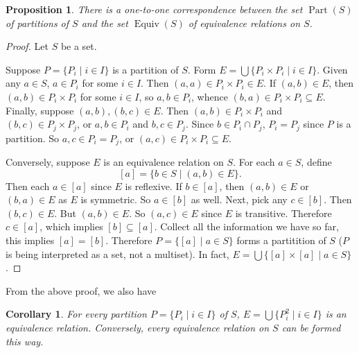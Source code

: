\documentclass[12pt]{article}
\newtheorem{prop}{Proposition}
\newtheorem{cor}{Corollary}
\begin{document}
\begin{prop}  There is a one-to-one correspondence between the set $\operatorname{Part}(S)$ of partitions of $S$ and the set $\operatorname{Equiv}(S)$ of equivalence relations on $S$.
\end{prop}

\begin{proof}
Let $S$ be a set.

Suppose $P=\lbrace P_i\mid i\in I\rbrace$ is a partition of $S$.  Form $E=\bigcup \lbrace P_i\times P_i\mid i\in I\rbrace$.  Given any $a\in S$, $a\in P_i$ for some $i\in I$.  Then $(a,a)\in P_i\times P_i\in E$.  If $(a,b)\in E$, then $(a,b)\in P_i\times P_i$ for some $i\in I$, so $a,b\in P_i$, whence $(b,a)\in P_i\times P_i\subseteq E$.  Finally, suppose $(a,b),(b,c)\in E$.  Then $(a,b)\in P_i\times P_i$ and $(b,c)\in P_j\times P_j$, or $a,b\in P_i$ and $b,c\in P_j$.  Since $b\in P_i\cap P_j$, $P_i=P_j$ since $P$ is a partition.  So $a,c\in P_i=P_j$, or $(a,c)\in P_i\times P_i\subseteq E$.

Conversely, suppose $E$ is an equivalence relation on $S$.  For each $a\in S$, define $$[a]=\lbrace b\in S\mid (a,b)\in E\rbrace.$$  Then each $a\in [a]$ since $E$ is reflexive.  If $b\in [a]$, then $(a,b)\in E$ or $(b,a)\in E$ as $E$ is symmetric.  So $a\in [b]$ as well.  Next, pick any $c\in [b]$.  Then $(b,c)\in E$.  But $(a,b)\in E$.  So $(a,c)\in E$ since $E$ is transitive.  Therefore $c\in [a]$, which implies $[b]\subseteq [a]$.  Collect all the information we have so far, this implies $[a]=[b]$.  Therefore $P=\lbrace [a]\mid a\in S\rbrace$ forms a partitition of $S$ ($P$ is being interpreted as a set, not a multiset).  In fact, $E=\bigcup \lbrace [a]\times [a]\mid a\in S\rbrace$.
\end{proof}

From the above proof, we also have

\begin{cor}  For every partition $P=\lbrace P_i\mid i\in I\rbrace$ of $S$, $E= \bigcup \lbrace P_i^2\mid i\in I\rbrace$ is an equivalence relation.  Conversely, every equivalence relation on $S$ can be formed this way.
\end{cor}
\end{document}
